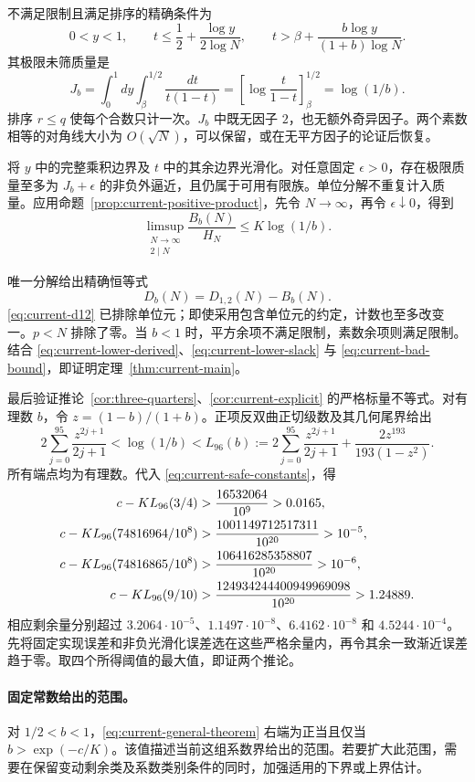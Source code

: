 不满足限制且满足排序的精确条件为
\[
 0<y<1,\qquad
 t\le\frac12+\frac{\log y}{2\log N},\qquad
 t>\beta+\frac{b\log y}{(1+b)\log N}.
\]
其极限未筛质量是
\begin{equation}
 J_b=\int_0^1dy\int_\beta^{1/2}\frac{dt}{t(1-t)}
     =\left[\log\frac{t}{1-t}\right]_\beta^{1/2}
     =\log(1/b).
 \label{eq:current-bad-mass}
\end{equation}
排序 $r\le q$ 使每个合数只计一次。$J_b$ 中既无因子 $2$，也无额外奇异因子。两个素数相等的对角线大小为 $O(\sqrt N)$，可以保留，或在无平方因子的论证后恢复。

将 $y$ 中的完整乘积边界及 $t$ 中的其余边界光滑化。对任意固定 $\epsilon>0$，存在极限质量至多为 $J_b+\epsilon$ 的非负外逼近，且仍属于可用有限族。单位分解不重复计入质量。应用命题~\ref{prop:current-positive-product}，先令 $N\to\infty$，再令 $\epsilon\downarrow0$，得到
\begin{equation}
 \limsup_{\substack{N\to\infty\\2\mid N}}
             \frac{B_b(N)}{H_N}\le K\log(1/b).
 \label{eq:current-bad-bound}
\end{equation}

唯一分解给出精确恒等式
\begin{equation}
                         D_b(N)=D_{1,2}(N)-B_b(N).
 \label{eq:current-exact-subtraction}
\end{equation}
\eqref{eq:current-d12} 已排除单位元；即使采用包含单位元的约定，计数也至多改变一。$p<N$ 排除了零。当 $b<1$ 时，平方余项不满足限制，素数余项则满足限制。结合 \eqref{eq:current-lower-derived}、\eqref{eq:current-lower-slack} 与 \eqref{eq:current-bad-bound}，即证明定理~\ref{thm:current-main}。

最后验证推论~\ref{cor:three-quarters}、\ref{cor:current-explicit} 的严格标量不等式。对有理数 $b$，令 $z=(1-b)/(1+b)$。正项反双曲正切级数及其几何尾界给出
\begin{equation}
 2\sum_{j=0}^{95}\frac{z^{2j+1}}{2j+1}
 <\log(1/b)
 <L_{96}(b):=
 2\sum_{j=0}^{95}\frac{z^{2j+1}}{2j+1}
       +\frac{2z^{193}}{193(1-z^2)}.
 \label{eq:current-log-certificate}
\end{equation}
所有端点均为有理数。代入 \eqref{eq:current-safe-constants}，得
\begin{align}
 c-KL_{96}(3/4)&>\frac{16532064}{10^9}>0.0165,\notag\\
 c-KL_{96}(74816964/10^8)
     &>\frac{1001149712517311}{10^{20}}>10^{-5},\notag\\
 c-KL_{96}(74816865/10^8)
     &>\frac{106416285358807}{10^{20}}>10^{-6},
                 \label{eq:current-rational-margins}\\
 c-KL_{96}(9/10)
     &>\frac{124934244400949969098}{10^{20}}>1.24889.\notag
\end{align}
相应剩余量分别超过 $3.2064\cdot10^{-5}$、$1.1497\cdot10^{-8}$、$6.4162\cdot10^{-8}$ 和 $4.5244\cdot10^{-4}$。先将固定实现误差和非负光滑化误差选在这些严格余量内，再令其余一致渐近误差趋于零。取四个所得阈值的最大值，即证两个推论。

\paragraph{固定常数给出的范围。}
对 $1/2<b<1$，\eqref{eq:current-general-theorem} 右端为正当且仅当 $b>\exp(-c/K)$。该值描述当前这组系数界给出的范围。若要扩大此范围，需要在保留变动剩余类及系数类别条件的同时，加强适用的下界或上界估计。
